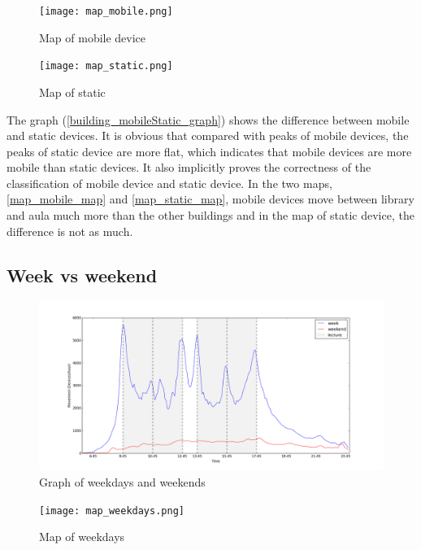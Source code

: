 \begin{figure}[H]
	\centering
	\texttt{[image: map\_mobile.png]}
	\captionsetup{justification=centering}
	\caption{Map of mobile device}
	\label{map_mobile_map}
\end{figure}

\begin{figure}[H]
	\centering
	\texttt{[image: map\_static.png]}
	\captionsetup{justification=centering}
	\caption{Map of static}
	\label{map_static_map}
\end{figure}
The graph (\autoref{building_mobileStatic_graph}) shows the difference between mobile and static devices. It is obvious that compared with peaks of mobile devices, the peaks of static device are more flat, which indicates that mobile devices are more mobile than static devices. It also implicitly proves the correctness of the classification of mobile device and static device.
In the two maps, \autoref{map_mobile_map} and \autoref{map_static_map}, mobile devices move between library and aula much more than the other buildings and in the map of static device, the difference is not as much.
\subsection{Week vs weekend}\label{chapter9weekweekend}
\begin{figure}[H]
	\centering
	\includegraphics[scale=0.3]{building_weekWeekend_graph.png}
	\captionsetup{justification=centering}
	\caption{Graph of weekdays and weekends}
	\label{building_weekWeekend_graph}
\end{figure}


\begin{figure}[H]
	\centering
	\texttt{[image: map\_weekdays.png]}
	\captionsetup{justification=centering}
	\caption{Map of weekdays}
	\label{weekdays_map}
\end{figure}

